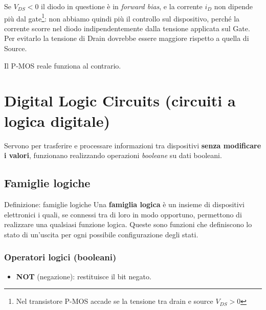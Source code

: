 \documentclass[
]{book}
\providecommand{\tightlist}{%
  \setlength{\itemsep}{0pt}\setlength{\parskip}{0pt}}
\begin{document}
Se \(V_{DS}<0\) il diodo in questione è in \emph{forward bias}, e la
corrente \(i_D\) non dipende più dal gate\footnote{Nel transistore P-MOS
  accade se la tensione tra drain e source \(V_{DS}>0\)}: non abbiamo
quindi più il controllo sul dispositivo, perché la corrente scorre nel
diodo indipendentemente dalla tensione applicata sul Gate. Per evitarlo
la tensione di Drain dovrebbe essere maggiore rispetto a quella di
Source.

Il P-MOS reale funziona al contrario.

\chapter{Digital Logic Circuits (circuiti a logica
digitale)}\label{digital-logic-circuits-circuiti-a-logica-digitale}

Servono per trasferire e processare informazioni tra dispositivi
\textbf{senza modificare i valori}, funzionano realizzando operazioni
\emph{booleane} su dati booleani.

\section{Famiglie logiche}\label{famiglie-logiche}

\begin{redbox}{Definizione: famiglie logiche}
Una \textbf{famiglia logica} è un insieme di dispositivi elettronici i quali, se connessi tra di loro in modo opportuno, permettono di realizzare una qualsiasi funzione logica. Queste sono funzioni che definiscono lo stato di un'uscita per ogni possibile configurazione degli stati.
\end{redbox}

\subsection{Operatori logici
(booleani)}\label{operatori-logici-booleani}

\begin{itemize}
\tightlist
\item
  \textbf{NOT} (negazione): restituisce il bit negato.
\end{itemize}
\end{document}
